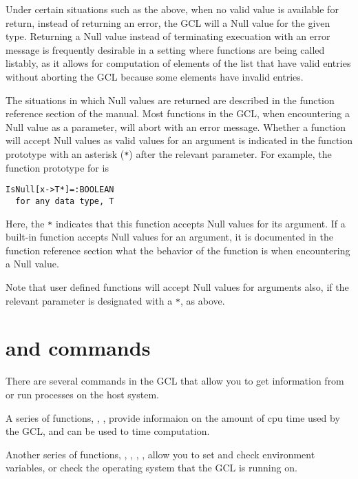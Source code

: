 Under certain situations such as the above, when no valid value is
available for return, instead of returning an error, the GCL will
a Null value for the given type.  Returning a Null value instead of
terminating execuation with an error message is frequently desirable
in a setting where functions are being called listably, as it allows
for computation of elements of the list that have valid entries
without aborting the GCL because some elements have invalid entries.  

The situations in which Null values are returned are described in the
function reference section of the manual.  Most functions in the GCL,
when encountering a Null value as a parameter, will abort with an
error message.  Whether a function will accept Null values as valid
values for an argument is indicated in the function prototype with an
asterisk (\verb+*+) after the relevant parameter.  For example, the
function prototype for  is

\begin{verbatim}
IsNull[x->T*]=:BOOLEAN
  for any data type, T
\end{verbatim}

Here, the \verb+*+ indicates that this function accepts Null values
for its argument.  If a built-in function accepts Null values for an
argument, it is documented in the function reference section what the
behavior of the function is when encountering a Null value.  

Note that user defined functions  will accept Null values for
arguments also, if the relevant parameter is designated with a
\verb+*+, as above. 

\section{ and commands}

There are several commands in the GCL that allow you to get
information from or run processes on the host system.  

A series of functions, , ,
 provide informaion on the amount of cpu time
used by the GCL, and can be used to time computation.  

Another series of functions, , ,
, , allow you to set and check
environment variables, or check the operating system that the GCL is
running on.

